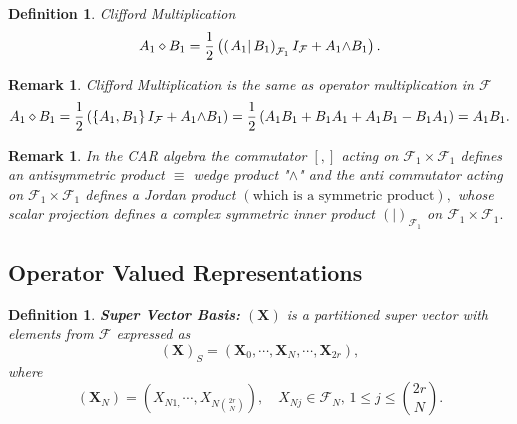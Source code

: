 \documentclass[aps,preprint]{revtex4}
\newtheorem{definition}[theorem]{Definition}
\newtheorem{remark}[theorem]{Remark}
\begin{document}
\begin{definition}
Clifford Multiplication 
\begin{equation}
A_{1}\diamond B_{1}=\frac{1}{2}\left( \left( \left. A_{1}\right\vert
B_{1}\right) _{\mathcal{F}_{1}}I_{\mathcal{F}}+A_{1}{\large \wedge }%
B_{1}\right) .
\end{equation}
\end{definition}

\begin{remark}
Clifford Multiplication is the same as operator multiplication in $\mathcal{F%
}$ 
\begin{equation}
A_{1}\diamond B_{1}=\frac{1}{2}\left( \left\{ A_{1},B_{1}\right\} I_{%
\mathcal{F}}+A_{1}{\large \wedge }B_{1}\right) =\frac{1}{2}\left(
A_{1}B_{1}+B_{1}A_{1}+A_{1}B_{1}-B_{1}A_{1}\right) =A_{1}B_{1}.
\end{equation}
\end{remark}

\begin{remark}
In the CAR algebra the commutator $\left[ ,\right] $ acting on $\mathcal{F}%
_{1}\times \mathcal{F}_{1}$ defines an antisymmetric product $\equiv $ wedge
product "$\wedge $" and the anti commutator acting on $\mathcal{F}_{1}\times 
\mathcal{F}_{1}$ defines a Jordan product $\left( \text{which is a symmetric
product}\right) ,$ whose scalar projection defines a complex symmetric inner
product $\left( \left. {}\right\vert \right) _{\mathcal{F}_{1}}$ on $%
\mathcal{F}_{1}\times \mathcal{F}_{1}.$
\end{remark}

\subsection{ Operator Valued Representations}

\begin{definition}
\textbf{Super Vector Basis:} $\left( \boldsymbol{X}\right) $ is a
partitioned super vector with elements from $\mathcal{F}$ expressed as 
\begin{equation}
\left( \boldsymbol{X}\right) _{S}=\left( \boldsymbol{X}_{0},\cdots ,%
\boldsymbol{X}_{N},\cdots ,\boldsymbol{X}_{2r}\right) ,
\end{equation}%
where%
\begin{equation}
\left( \boldsymbol{X}_{N}\right) =\left( X_{N1,}\cdots ,X_{N\binom{2r}{N}%
}\right) ,\quad X_{Nj}\in \mathcal{F}_{N},\,1\leq j\leq \binom{2r}{N}.
\end{equation}
\end{definition}
\end{document}
